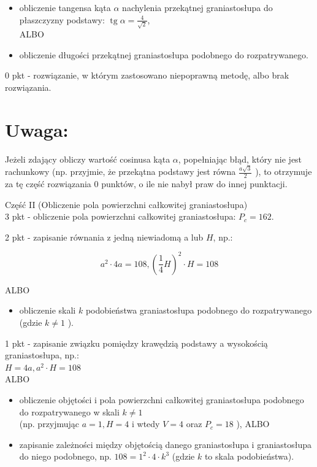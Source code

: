 \documentclass[10pt]{article}
\begin{document}
\begin{itemize}
  \item obliczenie tangensa kąta $\alpha$ nachylenia przekątnej graniastosłupa do płaszczyzny podstawy: $\operatorname{tg} \alpha=\frac{4}{\sqrt{2}}$,\\
ALBO
  \item obliczenie długości przekątnej graniastosłupa podobnego do rozpatrywanego.
\end{itemize}

0 pkt - rozwiązanie, w którym zastosowano niepoprawną metodę, albo brak rozwiązania.

\section*{Uwaga:}
Jeżeli zdający obliczy wartość cosinusa kąta $\alpha$, popełniając błąd, który nie jest rachunkowy (np. przyjmie, że przekątna podstawy jest równa $\frac{a \sqrt{3}}{2}$ ), to otrzymuje za tę część rozwiązania 0 punktów, o ile nie nabył praw do innej punktacji.

Część II (Obliczenie pola powierzchni całkowitej graniastosłupa)\\
3 pkt - obliczenie pola powierzchni całkowitej graniastosłupa: $P_{c}=162$.

2 pkt - zapisanie równania z jedną niewiadomą a lub $H$, np.:

$$
a^{2} \cdot 4 a=108,\left(\frac{1}{4} H\right)^{2} \cdot H=108
$$

ALBO

\begin{itemize}
  \item obliczenie skali $k$ podobieństwa graniastosłupa podobnego do rozpatrywanego (gdzie $k \neq 1$ ).
\end{itemize}

1 pkt - zapisanie związku pomiędzy krawędzią podstawy a wysokością graniastosłupa, np.:\\
$H=4 a, a^{2} \cdot H=108$\\
ALBO

\begin{itemize}
  \item obliczenie objętości i pola powierzchni całkowitej graniastosłupa podobnego do rozpatrywanego w skali $k \neq 1$\\
(np. przyjmując $a=1, H=4$ i wtedy $V=4$ oraz $P_{c}=18$ ), ALBO
  \item zapisanie zależności między objętością danego graniastosłupa i graniastosłupa do niego podobnego, np. $108=1^{2} \cdot 4 \cdot k^{3}$ (gdzie $k$ to skala podobieństwa).
\end{itemize}
\end{document}
